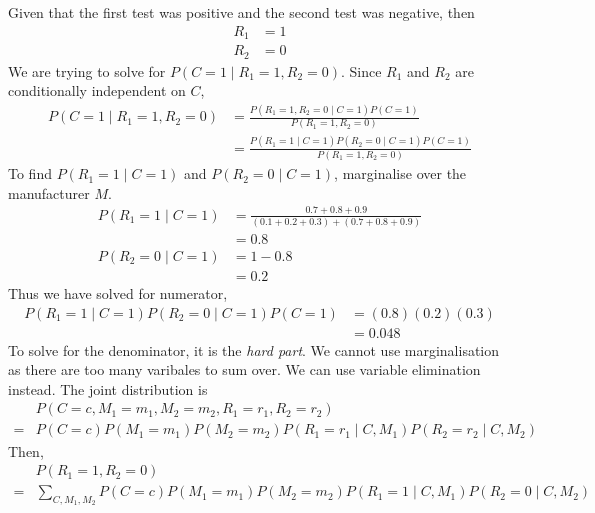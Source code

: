 \begin{enumerate}
        Given that the first test was positive and the second test was negative, then
        \begin{align*}
          R_1 & =1 \\
          R_2 & =0
        \end{align*}
        We are trying to solve for $P(C=1\mid R_1=1, R_2=0)$. Since $R_1$ and $R_2$ are conditionally independent on $C$,
        \begin{align*}
          P(C=1\mid R_1=1, R_2=0) & =\frac{P(R_1=1, R_2=0\mid C=1)P(C=1)}{P(R_1=1, R_2=0)}          \\[5pt]
                                  & =\frac{P(R_1=1\mid C=1)P(R_2=0\mid C=1)P(C=1)}{P(R_1=1, R_2=0)}
        \end{align*}
        To find $P(R_1=1\mid C=1)$ and $P(R_2=0\mid C=1)$, marginalise over the manufacturer $M$.
        \begin{align*}
          P(R_1=1\mid C=1) & =\frac{0.7+0.8+0.9}{(0.1+0.2+0.3)+(0.7+0.8+0.9)} \\[5pt]
                           & =0.8                                             \\
          P(R_2=0\mid C=1) & = 1-0.8                                          \\
                           & =0.2
        \end{align*}
        Thus we have solved for numerator,
        \begin{align*}
          P(R_1=1\mid C=1)P(R_2=0\mid C=1)P(C=1) & = (0.8)(0.2)(0.3) \\
                                                 & =0.048
        \end{align*}
        To solve for the denominator, it is the {\it hard part}. We cannot use marginalisation as there are too many varibales to sum over. We can use variable elimination instead. The joint distribution is
        \begin{align*}
            & P(C=c, M_1=m_1, M_2=m_2, R_1=r_1, R_2=r_2)                              \\
          = & P(C=c)P(M_1=m_1) P(M_2=m_2) P(R_1=r_1\mid C, M_1) P(R_2=r_2\mid C, M_2)
        \end{align*}
        Then,
        \begin{align*}
            & P(R_1=1, R_2=0)                                                                                                           \\[5pt]
          = & \sum_{C, M_1, M_2}P(C=c)P(M_1=m_1) P(M_2=m_2) P(R_1=1\mid C, M_1) P(R_2=0\mid C, M_2)                                     \\[5pt]

\end{align*}
\end{enumerate}
